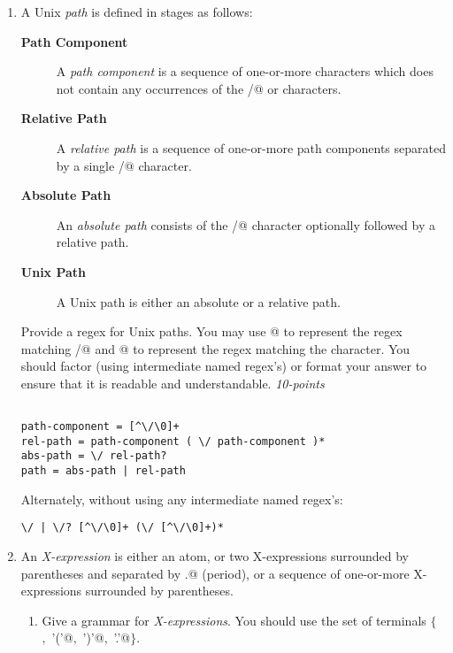 \documentclass[12pt]{article}
\begin{document}
\begin{enumerate}

\item A Unix \textit{path} is defined in stages as follows:

  \begin{description}
  \item[\textbf{Path Component}]
    A \textit{path component} is a sequence of one-or-more
  characters which does not contain any occurrences of the \verb@/@ or
  \verb@NUL@ characters.
\item[\textbf{Relative Path}] A \textit{relative path} is a sequence
  of one-or-more path components separated by a single \verb@/@
  character.
\item[\textbf{Absolute Path}]
  An \textit{absolute path} consists of the \verb@/@ character
  optionally followed by a relative path.
\item[\textbf{Unix Path}]
  A Unix path is either an absolute or a relative path.
    \end{description}

  Provide a regex for Unix paths.  You may use \verb@\/@ to represent
  the regex matching \verb@/@ and \verb@\0@ to represent the regex
  matching the \verb@NUL@ character.  You should factor (using
  intermediate named regex's) or format your answer to ensure that
  it is readable and understandable.
  \hfill{\textit{10-points}}

\begin{verbatim}

path-component = [^\/\0]+
rel-path = path-component ( \/ path-component )*
abs-path = \/ rel-path?
path = abs-path | rel-path
\end{verbatim}  

Alternately, without using any intermediate named regex's:
\begin{verbatim}
\/ | \/? [^\/\0]+ (\/ [^\/\0]+)*
\end{verbatim}

\item An \textit{X-expression} is either an atom, or two X-expressions
  surrounded by parentheses and separated by \verb@.@ (period), or a
  sequence of one-or-more X-expressions surrounded by parentheses.

  \begin{enumerate}
  \item Give a grammar for \textit{X-expressions}.  You should
    use the set of terminals $\{$ \verb@ATOM@$,$ \verb@'('@$,$ \verb@')'@$,$
      \verb@'.'@$\}$.


\end{enumerate}
\end{enumerate}
\end{document}
